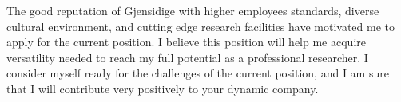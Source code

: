 \documentclass[11pt, a4paper]{awesome-cv}
\begin{document}
\begin{cvletter}
	  
The good reputation of Gjensidige with higher employees standards, diverse cultural environment, and cutting edge research facilities have motivated me to apply for the current position. I believe this position will help me acquire versatility needed to reach my full potential as a professional researcher. I consider myself ready for the challenges of the current position, and I am sure that I will contribute very positively to your dynamic company.
	\end{cvletter}
	
	
	\makeletterclosing
	
\end{document}
